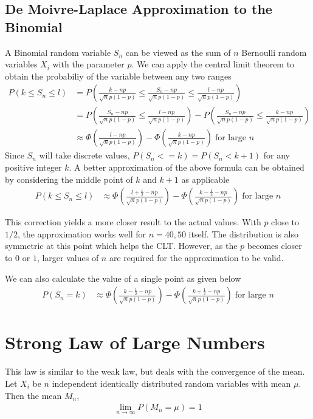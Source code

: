 \documentclass[../probability-notes.tex]{subfiles}
\begin{document}
    \subsection{De Moivre-Laplace Approximation to the Binomial}
    A Binomial random variable $S_{n}$ can be viewed as the sum of $n$ Bernoulli random variables $X_{i}$ with the parameter $p$. We can apply the central limit theorem to obtain the probabiliy of the variable between any two ranges
    \begin{align*}
        P(k \leq S_{n} \leq l) &= P(\frac{k - np}{\sqrt{n} p(1-p)} \leq \frac{S_{n} - np}{\sqrt{n} p(1-p)} \leq \frac{l - np}{\sqrt{n} p(1-p)})\\
        &= P(\frac{S_{n} - np}{\sqrt{n} p(1-p)} \leq \frac{l - np}{\sqrt{n} p(1-p)}) - P(\frac{S_{n} - np}{\sqrt{n} p(1-p)} \leq \frac{k - np}{\sqrt{n} p(1-p)})\\
        &\approx \Phi(\frac{l - np}{\sqrt{n} p(1-p)}) - \Phi(\frac{k - np}{\sqrt{n} p(1-p)}) \; \text{for large $n$}
    \end{align*}
    Since $S_{n}$ will take discrete values, $P(S_{n} <= k) = P(S_{n} < k+1)$ for any positive integer $k$. A better approximation of the above formula can be obtained by considering the middle point of $k$ and $k+1$ as applicable
    \begin{align*}
        P(k \leq S_{n} \leq l)&\approx \Phi(\frac{l + \frac{1}{2} - np}{\sqrt{n} p(1-p)}) - \Phi(\frac{k - \frac{1}{2} - np}{\sqrt{n} p(1-p)}) \; \text{for large $n$}
    \end{align*}

    This correction yields a more closer result to the actual values. With $p$ close to $1/2$, the approximation works well for $n = 40,50$ itself. The distribution is also symmetric at this point which helps the CLT.  However, as the $p$ becomes closer to $0$ or $1$, larger values of $n$ are required for the approximation to be valid.\newline

    We can also calculate the value of a single point as given below
    \begin{align*}
        P(S_{n} = k)&\approx \Phi(\frac{k - \frac{1}{2} - np}{\sqrt{n} p(1-p)}) - \Phi(\frac{k + \frac{1}{2} - np}{\sqrt{n} p(1-p)}) \; \text{for large $n$}
    \end{align*}


    \section{Strong Law of Large Numbers}
    This law is similar to the weak law, but deals with the convergence of the mean. Let $X_{i}$ be $n$ independent identically distributed random variables with mean $\mu$. Then the mean $M_{n}$,
    \begin{align*}
        \lim_{n \to \infty} P(M_{n} = \mu) = 1
    \end{align*}
\end{document}
